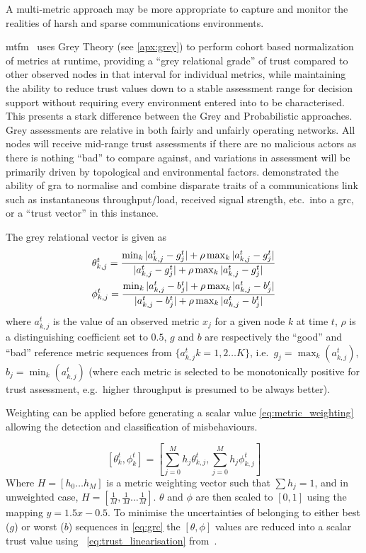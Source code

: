 A multi-metric approach may be more appropriate to capture and monitor the realities of harsh and sparse communications environments.

\gls{mtfm}~\cite{Guo11} uses Grey Theory (see \autoref{apx:grey}) to perform cohort based normalization of metrics at runtime, providing a ``grey relational grade'' of trust compared to other observed nodes in that interval for individual metrics, while maintaining the ability to reduce trust values down to a stable assessment range for decision support without requiring every environment entered into to be characterised.
This presents a stark difference between the Grey and Probabilistic approaches.
Grey assessments are relative in both fairly and unfairly operating networks.
All nodes will receive mid-range trust assessments if there are no malicious actors as there is nothing ``bad'' to compare against, and variations in assessment will be primarily driven by topological and environmental factors.
\citet{Guo11} demonstrated the ability of \gls{gra} to normalise and combine disparate traits of a communications link such as instantaneous throughput/load, received signal strength, etc.\ into a \gls{grc}, or a ``trust vector'' in this instance.

The grey relational vector is given as
%
\begin{align}
  \label{eq:grc}
  \theta_{k,j}^t = \frac{\min_k|a_{k,j}^t - g_j^t| + \rho \max_k|a_{k,j}^t-g_j^t|}{|a_{k,j}^t-g_j^t| + \rho \max_k|a_{k,j}^t-g_j^t|} \\
  \phi_{k,j}^t = \frac{\min_k|a_{k,j}^t - b_j^t| + \rho \max_k|a_{k,j}^t-b_j^t|}{|a_{k,j}^t-b_j^t| + \rho \max_k|a_{k,j}^t-b_j^t|} \notag 
\end{align}
%
where $a_{k,j}^t$ is the value of an observed metric $x_j$ for a given node $k$ at time $t$, $\rho$ is a distinguishing coefficient set to $0.5$, $g$ and $b$ are respectively the ``good'' and ``bad'' reference metric sequences from $\{a_{k,j}^t k=1,2\dots K\}$, i.e.\ $g_j=\max_k({a_{k,j}^t})$,  $b_j=\min_k({a_{k,j}^t})$ (where each metric is selected to be monotonically positive for trust assessment, e.g.\ higher throughput is presumed to be always better).

Weighting can be applied before generating a scalar value \eqref{eq:metric_weighting} allowing the detection and classification of misbehaviours.

%
\begin{equation}
  \label{eq:metric_weighting}
  [\theta_k^t, \phi_k^t] = \left[\sum_{j=0}^M h_j \theta_{k,j}^t,\sum_{j=0}^M h_j \phi_{k,j}^t \right]
\end{equation}
%
Where $H=[h_0\dots h_M]$ is a metric weighting vector such that $\sum h_j = 1$, and in unweighted case, $H=[\frac{1}{M},\frac{1}{M}\dots\frac{1}{M}]$.
$\theta$ and $\phi$ are then scaled to $[0,1]$ using the mapping $y = 1.5 x - 0.5$.
To minimise the uncertainties of belonging to either best ($g$) or worst ($b$) sequences in \eqref{eq:grc} the $[\theta,\phi]$ values are reduced into a scalar trust value using ~\autoref{eq:trust_linearisation} from~\cite{Hong2010}.

